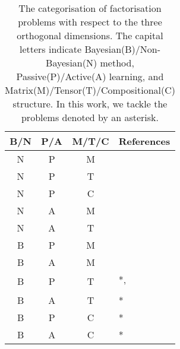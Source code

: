 \begin{table}[t]
\centering
\caption{\label{tbl:relatedwork}The categorisation of factorisation problems with respect to the three orthogonal dimensions. The capital letters indicate Bayesian(B)/Non-Bayesian(N) method, Passive(P)/Active(A) learning, and Matrix(M)/Tensor(T)/Compositional(C) structure. In this work, we tackle the problems denoted by an asterisk.}
\vskip 0.15in
\begin{tabular}{c c c l}
B/N & P/A & M/T/C & References	\\ \hline \hline

N & P & M & \citet{lee1999learning}\\ \hline

\multirow{2}{*}{N} & \multirow{2}{*}{P} & \multirow{2}{*}{T}& \citet{nickel2011three}\\
& & & \citet{kolda2009tensor}\\ \hline

N & P & C & \citet{Neelakantan2015} \\ \hline

N & A & M & \citet{ruchansky2015matrix}\\  \hline

N & A & T & \citet{kajino2015active} \\  \hline


B & P & M & \citet{mnih2007probabilistic}\\ \hline

\multirow{2}{*}{B} & \multirow{2}{*}{A} & \multirow{2}{*}{M}&  \citet{kawale2015efficient} \\
& & & \citet{sutherland2013active}\\ \hline

\multirow{2}{*}{B} & \multirow{2}{*}{P} & \multirow{2}{*}{T}& *, \citet{xiong2010temporal}\\
& & & \citet{schmidt2009probabilistic} \\ \hline

B & A & T & * \\ \hline

B & P & C & * \\ \hline

B & A & C & * \\ 
\end{tabular}
\end{table}

